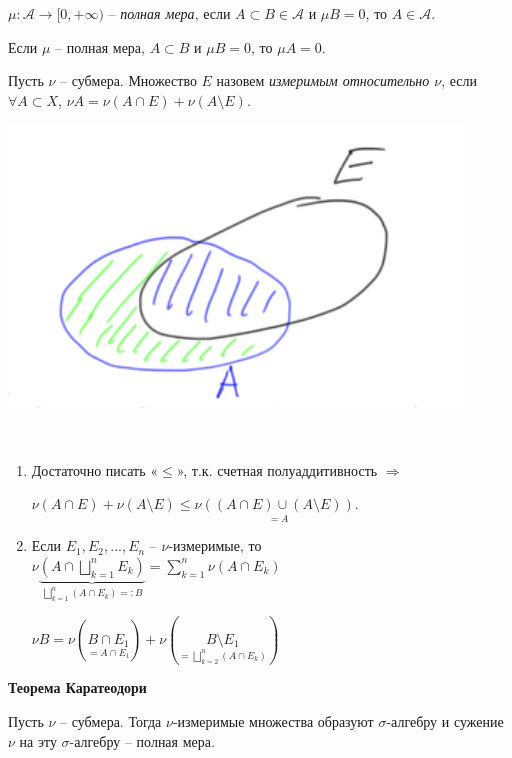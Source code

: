 \begin{definition}
    $\mu: \mathcal{A}\rightarrow [0, +\infty)$ – \textit{полная мера}, если $A\subset B \in \mathcal{A}$ и $\mu B=0$, 
    то $A\in \mathcal{A}$.
\end{definition}

\begin{remark}
    Если $\mu$ – полная мера, $A\subset B$ и $\mu B = 0$, то $\mu A = 0$.
\end{remark}

\begin{definition}
    Пусть $\nu$ – субмера. Множество $E$ назовем \textit{измеримым относительно $\nu$}, если $\forall A\subset X$, $\nu A = \nu (A\cap E) + \nu (A\setminus E)$.
\end{definition}

\includegraphics[width=0.2\linewidth]{images/23-09-14-1.png}

\begin{remark}~
    \begin{enumerate}
        \item Достаточно писать «$\leq$», т.к. счетная полуаддитивность $\Rightarrow $
        
        $\nu (A\cap E) + \nu (A\setminus E)\leq \nu \underset{=A}{((A\cap E) \cup (A\setminus E))}$.
        \item Если $E_1, E_2, ..., E_n$ – $\nu$-измеримые, то $\nu \underbrace{(A\cap \bigsqcup\limits_{k=1}^n E_k)}_{\bigsqcup\limits_{k=1}^n(A\cap E_k)=:B}=\sum\limits_{k=1}^n \nu (A\cap E_k)$

        $\nu B = \nu (\underset{=A\cap E_1}{B\cap E_1})+ \nu (\underset{=\bigsqcup\limits_{k=2}^n(A\cap E_k)}{B\setminus E_1})$
    \end{enumerate}
\end{remark}

\begin{theorem}
    \textbf{Теорема Каратеодори}

    Пусть $\nu$ – субмера. Тогда $\nu$-измеримые множества образуют $\sigma$-алгебру и сужение $\nu$ на эту 
    $\sigma$-алгебру – полная мера.
\end{theorem}


